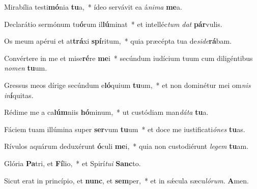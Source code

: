 \item Mirabília testi\textbf{mó}nia \textbf{tu}a,~* ídeo servávit ea á\textit{nima} \textbf{me}a.

\item Declarátio sermónum tu\textbf{ó}rum il\textbf{lú}minat~* et intelléc\textit{tum} \textit{dat} \textbf{pár}vulis.

\item Os meum apérui et at\textbf{trá}xi \textbf{spí}ritum,~* quia præcépta tua de\textit{side}\textbf{rá}bam.

\item Convértere in me et mise\textbf{ré}re \textbf{me}i~* secúndum iudícium tuum cum diligéntibus \textit{nomen} \textbf{tu}um.

\item Gressus meos dírige secúndum e\textbf{ló}quium \textbf{tu}um,~* et non dominétur mei om\textit{nis} \textit{in}\textbf{í}quitas.

\item Rédime me a ca\textbf{lúm}niis \textbf{hó}minum,~* ut custódiam man\textit{dáta} \textbf{tu}a.

\item Fáciem tuam illúmina super \textbf{ser}vum \textbf{tu}um~* et doce me iustificati\textit{ónes} \textbf{tu}as.

\item Rívulos aquárum deduxérunt \textbf{ó}culi \textbf{me}i,~* quia non custodiérunt \textit{legem} \textbf{tu}am.

\item Glória \textbf{Pa}tri, et \textbf{Fí}lio,~* et Spirí\textit{tui} \textbf{Sanc}to.

\item Sicut erat in princípio, et \textbf{nunc}, et \textbf{sem}per,~* et in sǽcula sæcu\textit{lórum}. \textbf{A}men.